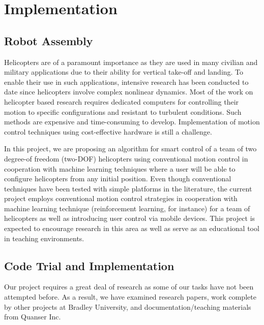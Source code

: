 \chapter{Implementation}
\label{ch: Chapter5}

\section{Robot Assembly}
Helicopters are of a paramount importance as
they are used in many civilian and military applications due to their ability for vertical take-off and landing. To enable their use in such applications, intensive research has been conducted to date since helicopters involve complex nonlinear dynamics. Most of the work on helicopter based research requires dedicated computers for controlling their motion to specific configurations and resistant to turbulent conditions. Such methods are expensive and time-consuming to develop. Implementation of motion control techniques using cost-effective hardware is still a challenge.

In this project, we are proposing an algorithm for smart control of a team of two degree-of freedom (two-DOF) helicopters using conventional motion control in cooperation with machine learning techniques where a user will be able to configure helicopters from any initial position. Even though conventional techniques have been tested with simple platforms in the literature, the current project employs conventional motion control strategies in cooperation with machine learning technique (reinforcement learning, for instance) for a team of helicopters as well as introducing user control via mobile devices. This project is expected to encourage research in this area as well as serve as an educational tool in teaching environments.


\section{Code Trial and Implementation}
Our project requires a great deal of research as some of our tasks have not been attempted before.  As a result, we have examined research papers, work complete by other projects at Bradley University, and documentation/teaching materials from Quanser Inc.

